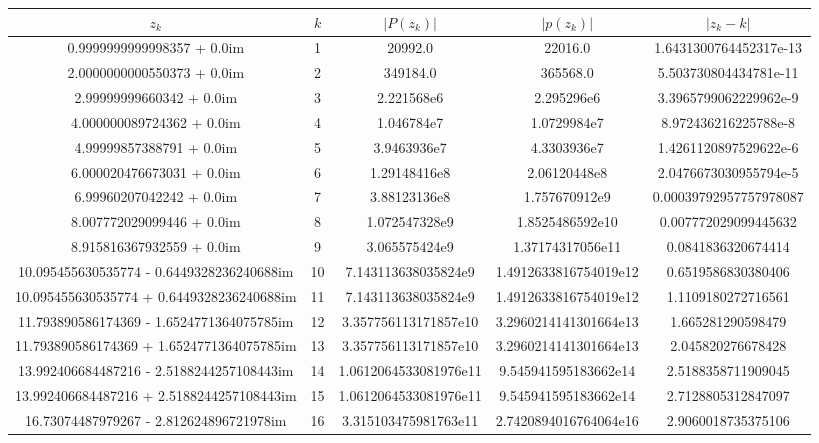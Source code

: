 \documentclass{article}
\begin{document}
\begin{table}[!htpb]
  \centering
  \begin{adjustbox}{center}
  \begin{tabular}{| c | c | c | c | c |}
    \hline
    $z_k$ & $k$ & $|P(z_k)|$ & $|p(z_k)|$ & $|z_k-k|$  \\
    \hline
    0.9999999999998357 + 0.0im & 1 & 20992.0 & 22016.0 & 1.6431300764452317e-13\\
    2.0000000000550373 + 0.0im & 2 & 349184.0 & 365568.0 & 5.503730804434781e-11\\
    2.99999999660342 + 0.0im & 3 & 2.221568e6 & 2.295296e6 & 3.3965799062229962e-9\\
    4.000000089724362 + 0.0im & 4 & 1.046784e7 & 1.0729984e7 & 8.972436216225788e-8\\
    4.99999857388791 + 0.0im & 5 & 3.9463936e7 & 4.3303936e7 & 1.4261120897529622e-6\\
    6.000020476673031 + 0.0im & 6 & 1.29148416e8 & 2.06120448e8 & 2.0476673030955794e-5\\
    6.99960207042242 + 0.0im & 7 & 3.88123136e8 & 1.757670912e9 & 0.00039792957757978087\\
    8.007772029099446 + 0.0im & 8 & 1.072547328e9 & 1.8525486592e10 & 0.007772029099445632\\
    8.915816367932559 + 0.0im & 9 & 3.065575424e9 & 1.37174317056e11 & 0.0841836320674414\\
    10.095455630535774 - 0.6449328236240688im & 10 & 7.143113638035824e9 & 1.4912633816754019e12 & 0.6519586830380406\\
    10.095455630535774 + 0.6449328236240688im & 11 & 7.143113638035824e9 & 1.4912633816754019e12 & 1.1109180272716561\\
    11.793890586174369 - 1.6524771364075785im & 12 & 3.357756113171857e10 & 3.2960214141301664e13 & 1.665281290598479\\
    11.793890586174369 + 1.6524771364075785im & 13 & 3.357756113171857e10 & 3.2960214141301664e13 & 2.045820276678428\\
    13.992406684487216 - 2.5188244257108443im & 14 & 1.0612064533081976e11 & 9.545941595183662e14 & 2.5188358711909045\\
    13.992406684487216 + 2.5188244257108443im & 15 & 1.0612064533081976e11 & 9.545941595183662e14 & 2.7128805312847097\\
    16.73074487979267 - 2.812624896721978im & 16 & 3.315103475981763e11 & 2.7420894016764064e16 & 2.9060018735375106\\

\end{tabular}
\end{adjustbox}
\end{table}
\end{document}
